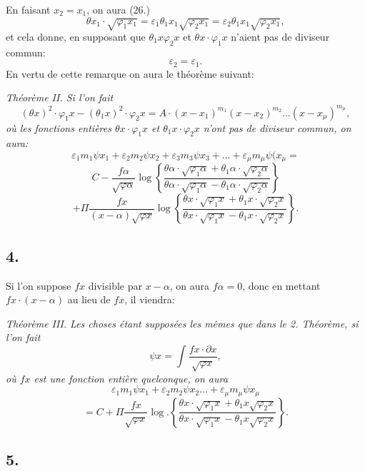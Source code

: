 \documentclass{article}
\begin{document}
En faisant $x_2 = x_1$, on aura (26.)
\[ \theta x_1 \cdot \sqrt{\varphi_1 x_1} = \varepsilon_1\theta_1 x_1\sqrt{\varphi_2 x_1} = \varepsilon_2\theta_1 x_1\sqrt{\varphi_2 x_1}, \]
et cela donne, en supposant que $\theta_1 x\varphi_2 x$ et $\theta x \cdot \varphi_1 x$ n'aient pas de diviseur commun:
\[ \varepsilon_2 = \varepsilon_1. \]
En vertu de cette remarque on aura le théorème suivant:

\emph{Théorème II. Si l'on fait}
\[ (\theta x)^{2} \cdot \varphi_1 x-(\theta_1 x)^{2} \cdot \varphi_2 x = A \cdot (x-x_1)^{m_1}(x-x_2)^{m_2}\ldots(x-x_\mu)^{m_\mu}, \tag{27} \]
\emph{où les fonctions entières $\theta x \cdot \varphi_1 x$ et $\theta_1 x \cdot \varphi_2 x$ n'ont pas de diviseur commun, on aura:}
\[ \varepsilon_1 m_1\psi x_1 + \varepsilon_2 m_2\psi x_2 + \varepsilon_3 m_3\psi x_3 + \ldots + \varepsilon_\mu m_\mu\psi(x_\mu = \tag{28} \]
\[ C - \frac{f\alpha}{\sqrt{\varphi\alpha}}\log\left\{\frac{\theta\alpha \cdot \sqrt{\varphi_1\alpha}+\theta_1\alpha \cdot \sqrt{\varphi_2\alpha}}{\theta\alpha \cdot \sqrt{\varphi_1\alpha}-\theta_1\alpha \cdot \sqrt{\varphi_2\alpha}}\right\} \]
\[ + \Pi\frac{fx}{(x-\alpha)\sqrt{\varphi x}}\log\left\{\frac{\theta x \cdot \sqrt{\varphi_1 x}+\theta_1 x \cdot \sqrt{\varphi_2 x}}{\theta x \cdot \sqrt{\varphi_1 x}-\theta_1 x \cdot \sqrt{\varphi_2 x}}\right\}. \]

\subsection*{4.}

Si l'on suppose $fx$ divisible par $x-\alpha$, on aura $f\alpha = 0$, donc en mettant $fx \cdot (x-\alpha)$ au lieu de $fx$, il viendra:

\emph{Théorème III. Les choses étant supposées les mêmes que dans le 2. Théorème, si l'on fait}
\[ \psi x = \int \frac{fx \cdot \partial x}{\sqrt{\varphi x}}, \]
\emph{où $fx$ est une fonction entière quelconque, on aura}
\[ \varepsilon_1 m_1\psi x_1 + \varepsilon_2 m_2\psi x_2 \ldots + \varepsilon_\mu m_\mu\psi x_\mu \tag{29} \]
\[ = C + \Pi\frac{fx}{\sqrt{\varphi x}}\log.\left\{\frac{\theta x \cdot \sqrt{\varphi_1 x}+\theta_1 x\sqrt{\varphi_2 x}}{\theta x \cdot \sqrt{\varphi_1 x}-\theta_1 x\sqrt{\varphi_2 x}}\right\}. \]

\subsection*{5.}
\end{document}
